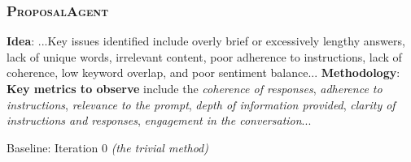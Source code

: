 \documentclass{article} %
\newcommand{\ProposalAgent}{\textsc{ProposalAgent}\xspace}
\begin{document}
\subsubsection{\ProposalAgent}
\label{sec:proposalagent}


\vspace{0.5em}

\begin{tcolorbox}[enhanced, breakable, title={An example of the proposal from \ProposalAgent}, colbacktitle=blue!55!black, coltitle=white, fonttitle=\bfseries, colframe=blue!55!black, colback=white, attach boxed title to top center={yshift=-2mm}, boxed title style = {sharp corners}]

    \begin{tcolorbox}[title={Idea \& Methodology}, colbacktitle=blue!50!white, coltitle=white, fonttitle=\bfseries, colback=blue!10!white, boxrule=0pt]
    \small
    \textbf{Idea}: ...Key issues identified include overly brief or excessively lengthy answers, lack of unique words, irrelevant content, poor adherence to instructions, lack of coherence, low keyword overlap, and poor sentiment balance...
    \tcblower
    \small
    \textbf{Methodology}: \textbf{Key metrics to observe} include the \textit{coherence of responses}, \textit{adherence to instructions}, \textit{relevance to the prompt}, \textit{depth of information provided}, \textit{clarity of instructions and responses}, \textit{engagement in the conversation}...
    \end{tcolorbox}
    \begin{tcolorbox}[title={Experiment Settings}, colbacktitle=blue!50!white, fonttitle=\bfseries, colback=blue!10!white, boxrule=0pt]
    \small
    Baseline: Iteration 0 \textit{(the trivial method)} \\

\end{tcolorbox}
\end{tcolorbox}
\end{document}

